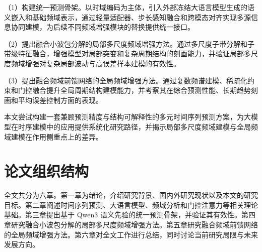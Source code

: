 （1）构建统一预测骨架。以时域编码为主体，引入外部冻结大语言模型生成的语义嵌入和基础频域表示，通过轻量适配器、步长感知融合和跨模态对齐实现多源信息协同建模，为后续不同频域增强模块的替换提供统一接口。

（2）提出融合小波包分解的局部多尺度频域增强方法。通过多尺度子带分解和子带级特征融合，增强模型对局部突变和复杂周期结构的刻画能力，并验证局部多尺度频域增强对复杂局部波动与高误差样本建模的有效性。

（3）提出融合频域前馈网络的全局频域增强方法。通过复数频谱建模、稀疏化约束和门控融合提升全局周期结构建模能力，并考察其在综合预测性能、长期趋势刻画和平均误差控制方面的表现。

本文尝试构建一套兼顾预测精度与结构可解释性的多元时间序列预测方案，为大模型在时序建模中的应用提供系统化研究路径，并揭示局部多尺度频域建模与全局频域建模在作用侧重点上的差异。

\section{论文组织结构}
全文共分为六章。第一章为绪论，介绍研究背景、国内外研究现状以及本文的研究目标。第二章阐述时间序列预测、大语言模型、频域分析和门控注意力等相关理论基础。第三章提出基于 Qwen3 语义先验的统一预测骨架，并验证其有效性。第四章研究融合小波包分解的局部多尺度频域增强方法。第五章研究融合频域前馈网络的全局频域增强方法。第六章对全文工作进行总结，同时讨论当前研究局限与未来发展方向。
